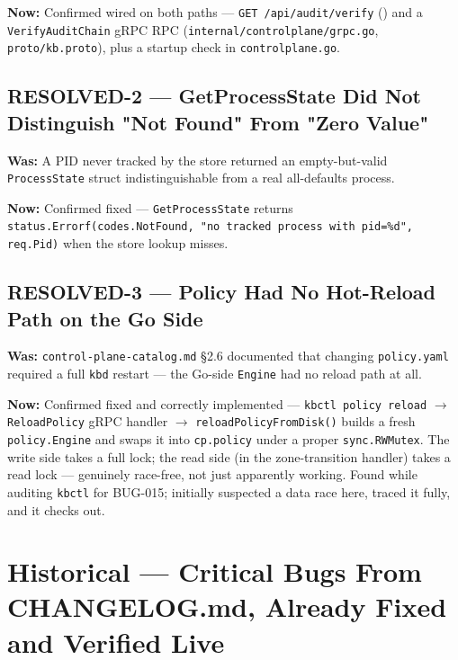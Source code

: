 \documentclass[11pt,a4paper]{article}
\begin{document}
\textbf{Now:} Confirmed wired on both paths --- \texttt{GET
/api/audit/verify} () and a
\texttt{VerifyAuditChain} gRPC RPC
(\texttt{internal/controlplane/grpc.go}, \texttt{proto/kb.proto}), plus a
startup check in \texttt{controlplane.go}.

\subsection*{RESOLVED-2 --- GetProcessState Did Not Distinguish "Not Found" From "Zero Value"}
\textbf{Was:} A PID never tracked by the store returned an empty-but-valid
\texttt{ProcessState} struct indistinguishable from a real all-defaults
process.

\textbf{Now:} Confirmed fixed --- \texttt{GetProcessState} returns
\texttt{status.Errorf(codes.NotFound, "no tracked process with
pid=\%d", req.Pid)} when the store lookup misses.

\subsection*{RESOLVED-3 --- Policy Had No Hot-Reload Path on the Go Side}
\textbf{Was:} \texttt{control-plane-catalog.md} \S 2.6 documented that
changing \texttt{policy.yaml} required a full \texttt{kbd} restart --- the
Go-side \texttt{Engine} had no reload path at all.

\textbf{Now:} Confirmed fixed and correctly implemented ---
\texttt{kbctl policy reload} $\rightarrow$ \texttt{ReloadPolicy} gRPC
handler $\rightarrow$ \texttt{reloadPolicyFromDisk()} builds a fresh
\texttt{policy.Engine} and swaps it into \texttt{cp.policy} under a proper
\texttt{sync.RWMutex}. The write side takes a full lock; the read side (in
the zone-transition handler) takes a read lock --- genuinely race-free,
not just apparently working. Found while auditing \texttt{kbctl} for
BUG-015; initially suspected a data race here, traced it fully, and it
checks out.

\clearpage

\section{Historical --- Critical Bugs From CHANGELOG.md, Already Fixed and Verified Live}
\end{document}
